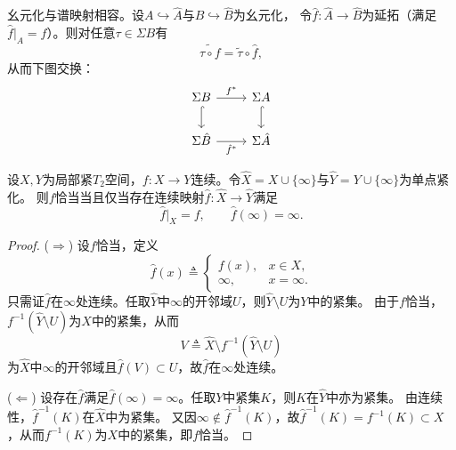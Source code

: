 \documentclass[lang=cn,a4paper,newtx,section]{elegantbook}
\begin{document}
\begin{remark}
  幺元化与谱映射相容。设$A \hookrightarrow \hat{A}$与$B \hookrightarrow \hat{B}$为幺元化，
  令$\hat{f}: \hat{A} \to \hat{B}$为延拓（满足$\hat{f}|_A = f$）。则对任意$\tau \in \Sigma B$有
  \begin{equation*}
    \widetilde{\tau \circ f} = \tilde{\tau} \circ \hat{f},
  \end{equation*}
  从而下图交换：
  \begin{equation*}
    \begin{tikzcd}
      \Sigma B \arrow[r, "f^*"] \arrow[d, hook] & \Sigma A \arrow[d, hook] \\
      \Sigma\hat{B} \arrow[r, "\hat{f}^*"'] & \Sigma\hat{A}
    \end{tikzcd}
  \end{equation*}
\end{remark}

\begin{proposition}\label{prop:proper-extend}
  设$X,Y$为局部紧$T_2$空间，$f: X \to Y$连续。令$\hat{X} = X \cup \{\infty\}$与$\hat{Y} = Y \cup \{\infty\}$为单点紧化。
  则$f$恰当当且仅当存在连续映射$\hat{f}: \hat{X} \to \hat{Y}$满足
  \begin{equation*}
    \hat{f}|_X = f, \qquad \hat{f}(\infty) = \infty.
  \end{equation*}
\end{proposition}

\begin{proof}
  ($\Rightarrow$) 设$f$恰当，定义
  \begin{equation*}
    \hat{f}(x) \triangleq \begin{cases}
      f(x), & x \in X, \\
      \infty, & x = \infty.
    \end{cases}
  \end{equation*}
  只需证$\hat{f}$在$\infty$处连续。任取$\hat{Y}$中$\infty$的开邻域$U$，则$\hat{Y}\setminus U$为$Y$中的紧集。
  由于$f$恰当，$f^{-1}(\hat{Y}\setminus U)$为$X$中的紧集，从而
  \begin{equation*}
    V \triangleq \hat{X} \setminus f^{-1}(\hat{Y}\setminus U)
  \end{equation*}
  为$\hat{X}$中$\infty$的开邻域且$\hat{f}(V) \subset U$，故$\hat{f}$在$\infty$处连续。
  
  ($\Leftarrow$) 设存在$\hat{f}$满足$\hat{f}(\infty)=\infty$。任取$Y$中紧集$K$，则$K$在$\hat{Y}$中亦为紧集。
  由连续性，$\hat{f}^{-1}(K)$在$\hat{X}$中为紧集。
  又因$\infty \notin \hat{f}^{-1}(K)$，故$\hat{f}^{-1}(K) = f^{-1}(K) \subset X$，从而$f^{-1}(K)$为$X$中的紧集，即$f$恰当。
\end{proof}
\end{document}
